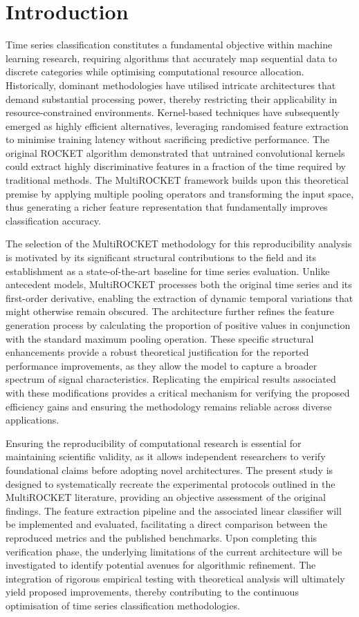 \documentclass{article}
\begin{document}
\section{Introduction}

Time series classification constitutes a fundamental objective within machine learning research, requiring algorithms that accurately map sequential data to discrete categories while optimising computational resource allocation. Historically, dominant methodologies have utilised intricate architectures that demand substantial processing power, thereby restricting their applicability in resource-constrained environments. Kernel-based techniques have subsequently emerged as highly efficient alternatives, leveraging randomised feature extraction to minimise training latency without sacrificing predictive performance. The original ROCKET algorithm demonstrated that untrained convolutional kernels could extract highly discriminative features in a fraction of the time required by traditional methods. The MultiROCKET framework builds upon this theoretical premise by applying multiple pooling operators and transforming the input space, thus generating a richer feature representation that fundamentally improves classification accuracy.

The selection of the MultiROCKET methodology for this reproducibility analysis is motivated by its significant structural contributions to the field and its establishment as a state-of-the-art baseline for time series evaluation. Unlike antecedent models, MultiROCKET processes both the original time series and its first-order derivative, enabling the extraction of dynamic temporal variations that might otherwise remain obscured. The architecture further refines the feature generation process by calculating the proportion of positive values in conjunction with the standard maximum pooling operation. These specific structural enhancements provide a robust theoretical justification for the reported performance improvements, as they allow the model to capture a broader spectrum of signal characteristics. Replicating the empirical results associated with these modifications provides a critical mechanism for verifying the proposed efficiency gains and ensuring the methodology remains reliable across diverse applications.

Ensuring the reproducibility of computational research is essential for maintaining scientific validity, as it allows independent researchers to verify foundational claims before adopting novel architectures. The present study is designed to systematically recreate the experimental protocols outlined in the MultiROCKET literature, providing an objective assessment of the original findings. The feature extraction pipeline and the associated linear classifier will be implemented and evaluated, facilitating a direct comparison between the reproduced metrics and the published benchmarks. Upon completing this verification phase, the underlying limitations of the current architecture will be investigated to identify potential avenues for algorithmic refinement. The integration of rigorous empirical testing with theoretical analysis will ultimately yield proposed improvements, thereby contributing to the continuous optimisation of time series classification methodologies.
\end{document}
